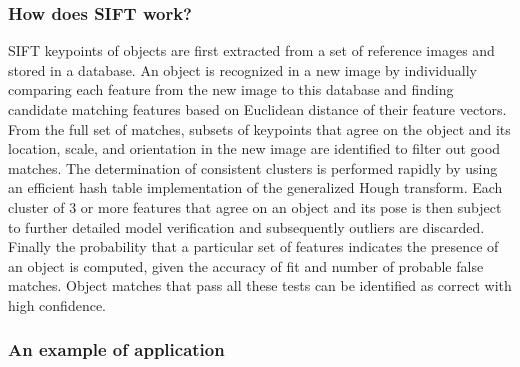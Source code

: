 \documentclass[a4paper,12pt]{report}
\begin{document}
			      \subsubsection{How does SIFT work?}
			      SIFT keypoints of objects are first extracted from a set of reference images\cite{Lowe_David} and stored in a database.
			      An object is recognized in a new image by individually comparing each feature from the new image to this database and finding candidate matching features based on Euclidean distance of their feature vectors.
			      From the full set of matches, subsets of keypoints that agree on the object and its location, scale, and orientation in the new image are identified to filter out good matches.
			      The determination of consistent clusters is performed rapidly by using an efficient hash table implementation of the generalized Hough transform. Each cluster of 3 or more features that agree on an object and its pose is then subject to further detailed model verification and subsequently outliers are discarded. Finally the probability that a particular set of features indicates the presence of an object is computed, given the accuracy of fit and number of probable false matches. Object matches that pass all these tests can be identified as correct with high confidence.\cite{Lowe_David_2}
			      
			      \subsubsection{An example of application}
			      
			      
		\subsection{}
			      
\end{document}
